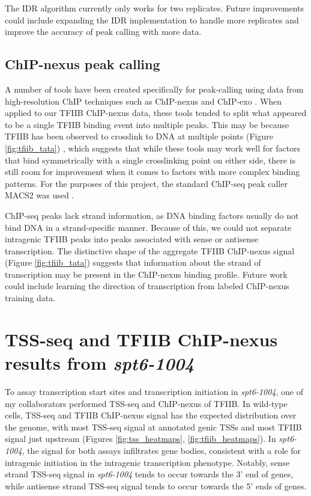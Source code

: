 The IDR algorithm currently only works for two replicates.
Future improvements could include expanding the IDR implementation to handle more replicates and improve the accuracy of peak calling with more data.

\subsection{ChIP-nexus peak calling}

A number of tools have been created specifically for peak-calling using data from high-resolution ChIP techniques such as ChIP-nexus and ChIP-exo \citep{wang2014, hansen2016}.
When applied to our TFIIB ChIP-nexus data, these tools tended to split what appeared to be a single TFIIB binding event into multiple peaks.
This may be because TFIIB has been observed to crosslink to DNA at multiple points (Figure \ref{fig:tfiib_tata}) \citep{rhee2012}, which suggests that while these tools may work well for factors that bind symmetrically with a single crosslinking point on either side, there is still room for improvement when it comes to factors with more complex binding patterns.
For the purposes of this project, the standard ChIP-seq peak caller MACS2 was used \citep{zhang2008}.

ChIP-seq peaks lack strand information, as DNA binding factors usually do not bind DNA in a strand-specific manner.
Because of this, we could not separate intragenic TFIIB peaks into peaks associated with sense or antisense transcription.
The distinctive shape of the aggregate TFIIB ChIP-nexus signal (Figure \ref{fig:tfiib_tata}) suggests that information about the strand of transcription may be present in the ChIP-nexus binding profile.
Future work could include learning the direction of transcription from labeled ChIP-nexus training data.

\section{TSS-seq and TFIIB ChIP-nexus results from \textit{spt6-1004}}

To assay transcription start sites and transcription initiation in \textit{spt6-1004}, one of my collaborators performed TSS-seq and ChIP-nexus of TFIIB.
In wild-type cells, TSS-seq and TFIIB ChIP-nexus signal has the expected distribution over the genome, with most TSS-seq signal at annotated genic TSSs and most TFIIB signal just upstream (Figures \ref{fig:tss_heatmaps}, \ref{fig:tfiib_heatmaps}).
In \textit{spt6-1004}, the signal for both assays infiltrates gene bodies, consistent with a role for intragenic initiation in the intragenic transcription phenotype.
Notably, sense strand TSS-seq signal in \textit{spt6-1004} tends to occur towards the 3' end of genes, while antisense strand TSS-seq signal tends to occur towards the 5' ends of genes.

